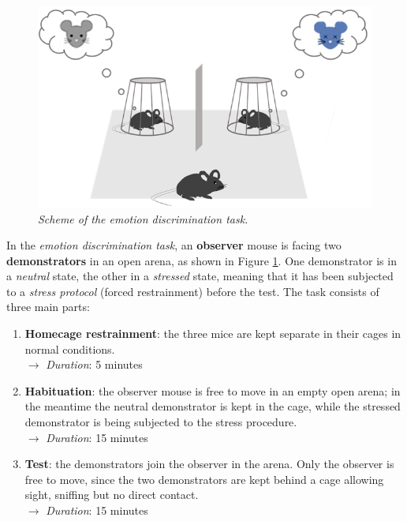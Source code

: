 \documentclass[12pt, a4paper]{report}
\begin{document}
\begin{figure}[H]
	\begin{center}
		\includegraphics[scale=.65]{emotion_discrimination.png} 
	\end{center} 
	\caption{\textit{Scheme of the emotion discrimination task.}} \label{edt}
	
\end{figure}

In the \textit{emotion discrimination task}, an \textbf{observer} mouse is facing two \textbf{demonstrators} in an open arena, as shown in Figure \ref{edt}. One demonstrator is in a \textit{neutral} state, the other in a \textit{stressed} state, meaning that it has been subjected to a \textit{stress protocol} (forced restrainment) before the test. The task consists of three main parts:

\begin{enumerate}
	
	\item \textbf{Homecage restrainment}: the three mice are kept separate in their cages in normal conditions. \\
	$\longrightarrow$ \textit{Duration}: 5 minutes
	
	\item \textbf{Habituation}: the observer mouse is free to move in an empty open arena; in the meantime the neutral demonstrator is kept in the cage, while the stressed demonstrator is being subjected to the stress procedure. \\
	$\longrightarrow$  \textit{Duration}: 15 minutes
	
	\item \textbf{Test}: the demonstrators join the observer in the arena. Only the observer is free to move, since the two demonstrators are kept behind a cage allowing sight, sniffing but no direct contact. \\
	$\longrightarrow$  \textit{Duration}: 15 minutes
\end{enumerate}
\end{document}
